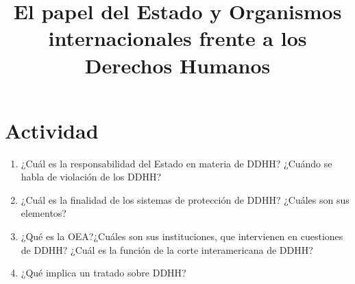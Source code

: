 \documentclass{article}
\title{El papel del Estado y Organismos internacionales frente a los Derechos Humanos}
\begin{document}
\maketitle

\section{Actividad}

\begin{enumerate}
      \item ¿Cuál es la responsabilidad del Estado en materia de DDHH?
            ¿Cuándo se habla de violación de los DDHH?
      \item ¿Cuál es la finalidad de los sistemas de protección de DDHH?
            ¿Cuáles son sus elementos?
      \item ¿Qué es la OEA?¿Cuáles son sus instituciones, que intervienen en cuestiones de DDHH?
            ¿Cuál es la función de la corte interamericana de DDHH?
      \item ¿Qué implica un tratado sobre DDHH?
\end{enumerate}
\end{document}
